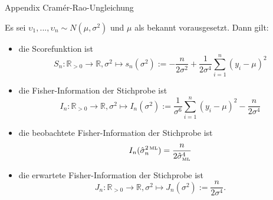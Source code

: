 \documentclass[
  8pt,
  ignorenonframetext,
]{beamer}
\newcommand{\ups} {\upsilon}
\begin{document}
\begin{frame}{Appendix \textbar{} Cramér-Rao-Ungleichung}
\protect\hypertarget{appendix-cramuxe9r-rao-ungleichung-13}{}
\footnotesize
\begin{theorem}
\justifying
\normalfont
Es sei $\ups_1,...,\ups_n \sim N(\mu,\sigma^2)$ und $\mu$ als bekannt vorausgesetzt. Dann gilt:
\begin{itemize}
\item die Scorefunktion ist
\begin{equation}
S_n : \mathbb{R}_{>0} \to \mathbb{R}, \sigma^2 \mapsto s_n(\sigma^2) :=
- \frac{n}{2 \sigma^2} + \frac{1}{2\sigma^4}\sum_{i=1}^n(y_i-\mu)^2
\end{equation}
\item die Fisher-Information der Stichprobe ist
\begin{equation}
I_n : \mathbb{R}_{>0} \to \mathbb{R}, \sigma^2 \mapsto I_n(\sigma^2) :=
\frac{1}{\sigma^6}\sum_{i=1}^n (y_i - \mu)^2 - \frac{n}{2\sigma^4}
\end{equation}
\item die beobachtete Fisher-Information der Stichprobe ist
\begin{equation}
I_n(\hat{\sigma}^{2\,\mbox{\tiny ML}}_n) =  \frac{n}{2\hat{\sigma}_{\mbox{\tiny ML}}^4 }
\end{equation}
\item die erwartete Fisher-Information der Stichprobe ist
\begin{equation}
J_n : \mathbb{R}_{>0} \to \mathbb{R}, \sigma^2 \mapsto J_n(\sigma^2) := \frac{n}{2\sigma^4}.
\end{equation}
\end{itemize}
\end{theorem}
\end{frame}
\end{document}
